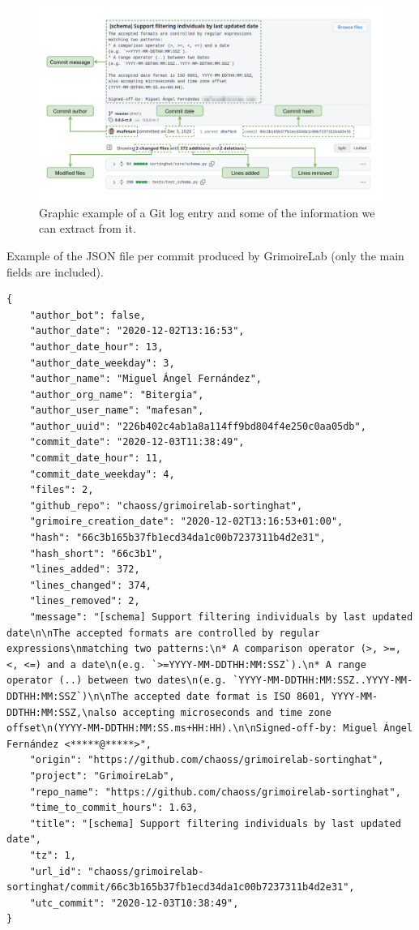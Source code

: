 \documentclass[a4paper, 12pt]{book}
\begin{document}
\begin{figure}
  \centering
  \includegraphics[width=16cm, keepaspectratio]{img/example-commit-mafesan.drawio.png}
  \caption{Graphic example of a Git log entry and some of the information we can extract from it.}
  \label{fig:example-commit-github}
\end{figure}

\begin{listing}[h!]
    \caption{Example of the JSON file per commit produced by GrimoireLab (only the main fields are included).}{}
    \label{lst:git-elasticsearch}
    \begin{verbatim}
{
    "author_bot": false,
    "author_date": "2020-12-02T13:16:53",
    "author_date_hour": 13,
    "author_date_weekday": 3,
    "author_name": "Miguel Ángel Fernández",
    "author_org_name": "Bitergia",
    "author_user_name": "mafesan",
    "author_uuid": "226b402c4ab1a8a114ff9bd804f4e250c0aa05db",
    "commit_date": "2020-12-03T11:38:49",
    "commit_date_hour": 11,
    "commit_date_weekday": 4,
    "files": 2,
    "github_repo": "chaoss/grimoirelab-sortinghat",
    "grimoire_creation_date": "2020-12-02T13:16:53+01:00",
    "hash": "66c3b165b37fb1ecd34da1c00b7237311b4d2e31",
    "hash_short": "66c3b1",
    "lines_added": 372,
    "lines_changed": 374,
    "lines_removed": 2,
    "message": "[schema] Support filtering individuals by last updated date\n\nThe accepted formats are controlled by regular expressions\nmatching two patterns:\n* A comparison operator (>, >=, <, <=) and a date\n(e.g. `>=YYYY-MM-DDTHH:MM:SSZ`).\n* A range operator (..) between two dates\n(e.g. `YYYY-MM-DDTHH:MM:SSZ..YYYY-MM-DDTHH:MM:SSZ`)\n\nThe accepted date format is ISO 8601, YYYY-MM-DDTHH:MM:SSZ,\nalso accepting microseconds and time zone offset\n(YYYY-MM-DDTHH:MM:SS.ms+HH:HH).\n\nSigned-off-by: Miguel Ángel Fernández <*****@*****>",
    "origin": "https://github.com/chaoss/grimoirelab-sortinghat",
    "project": "GrimoireLab",
    "repo_name": "https://github.com/chaoss/grimoirelab-sortinghat",
    "time_to_commit_hours": 1.63,
    "title": "[schema] Support filtering individuals by last updated date",
    "tz": 1,
    "url_id": "chaoss/grimoirelab-sortinghat/commit/66c3b165b37fb1ecd34da1c00b7237311b4d2e31",
    "utc_commit": "2020-12-03T10:38:49",
}
    \end{verbatim}
\end{listing}
\end{document}
